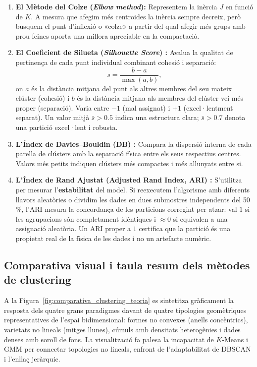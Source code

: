\documentclass[a4paper,11pt]{article}
\begin{document}
\begin{enumerate}
    \item \textbf{El Mètode del Colze (\emph{Elbow method}):} Representem la inèrcia $J$ en funció de $K$. A mesura que afegim més centroides la inèrcia sempre decreix, però busquem el punt d'inflexió o «colze» a partir del qual afegir més grups amb prou feines aporta una millora apreciable en la compactació.
    \item \textbf{El Coeficient de Silueta (\emph{Silhouette Score}) \cite{rousseeuw}:} Avalua la qualitat de pertinença de cada punt individual combinant cohesió i separació:
    \begin{equation}
        s = \frac{b - a}{\max(a, b)},
    \end{equation}
    on $a$ és la distància mitjana del punt als altres membres del seu mateix clúster (cohesió) i $b$ és la distància mitjana als membres del clúster veí més proper (separació). Varia entre $-1$ (mal assignat) i $+1$ (excel·lentment separat). Un valor mitjà $\bar{s} > 0.5$ indica una estructura clara; $\bar{s} > 0.7$ denota una partició excel·lent i robusta.
    \item \textbf{L'Índex de Davies--Bouldin (DB) \cite{db}:} Compara la dispersió interna de cada parella de clústers amb la separació física entre els seus respectius centres. Valors més petits indiquen clústers més compactes i més allunyats entre si.
    \item \textbf{L'Índex de Rand Ajustat (Adjusted Rand Index, ARI) \cite{hubert}:} S'utilitza per mesurar l'\textbf{estabilitat} del model. Si reexecutem l'algorisme amb diferents llavors aleatòries o dividim les dades en dues submostres independents del 50\,\%, l'ARI mesura la concordança de les particions corregint per atzar: val $1$ si les agrupacions són completament idèntiques i $\approx 0$ si equivalen a una assignació aleatòria. Un ARI proper a $1$ certifica que la partició és una propietat real de la física de les dades i no un artefacte numèric.
\end{enumerate}

\subsection{Comparativa visual i taula resum dels mètodes de clustering}

A la Figura~\ref{fig:comparativa_clustering_teoria} es sintetitza gràficament la resposta dels quatre grans paradigmes davant de quatre tipologies geomètriques representatives de l'espai bidimensional: formes no convexes (anells concèntrics), varietats no lineals (mitges llunes), cúmuls amb densitats heterogènies i dades denses amb soroll de fons. La visualització fa palesa la incapacitat de $K$-Means i GMM per connectar topologies no lineals, enfront de l'adaptabilitat de DBSCAN i l'enllaç jeràrquic.
\end{document}
